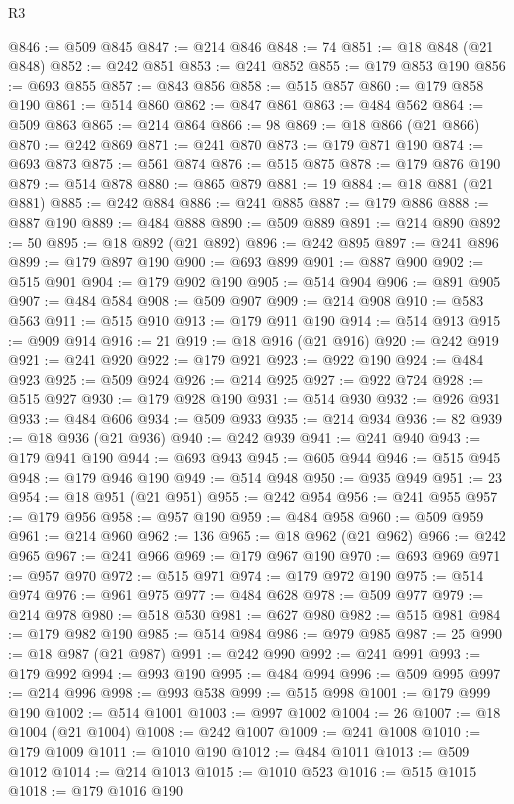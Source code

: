 \begin{lexlean}{R3}
\begin{coremodule}
@846 := @509 @845
@847 := @214 @846
@848 := 74
@851 := @18 @848 (@21 @848)
@852 := @242 @851
@853 := @241 @852
@855 := @179 @853 @190
@856 := @693 @855
@857 := @843 @856
@858 := @515 @857
@860 := @179 @858 @190
@861 := @514 @860
@862 := @847 @861
@863 := @484 @562
@864 := @509 @863
@865 := @214 @864
@866 := 98
@869 := @18 @866 (@21 @866)
@870 := @242 @869
@871 := @241 @870
@873 := @179 @871 @190
@874 := @693 @873
@875 := @561 @874
@876 := @515 @875
@878 := @179 @876 @190
@879 := @514 @878
@880 := @865 @879
@881 := 19
@884 := @18 @881 (@21 @881)
@885 := @242 @884
@886 := @241 @885
@887 := @179 @886
@888 := @887 @190
@889 := @484 @888
@890 := @509 @889
@891 := @214 @890
@892 := 50
@895 := @18 @892 (@21 @892)
@896 := @242 @895
@897 := @241 @896
@899 := @179 @897 @190
@900 := @693 @899
@901 := @887 @900
@902 := @515 @901
@904 := @179 @902 @190
@905 := @514 @904
@906 := @891 @905
@907 := @484 @584
@908 := @509 @907
@909 := @214 @908
@910 := @583 @563
@911 := @515 @910
@913 := @179 @911 @190
@914 := @514 @913
@915 := @909 @914
@916 := 21
@919 := @18 @916 (@21 @916)
@920 := @242 @919
@921 := @241 @920
@922 := @179 @921
@923 := @922 @190
@924 := @484 @923
@925 := @509 @924
@926 := @214 @925
@927 := @922 @724
@928 := @515 @927
@930 := @179 @928 @190
@931 := @514 @930
@932 := @926 @931
@933 := @484 @606
@934 := @509 @933
@935 := @214 @934
@936 := 82
@939 := @18 @936 (@21 @936)
@940 := @242 @939
@941 := @241 @940
@943 := @179 @941 @190
@944 := @693 @943
@945 := @605 @944
@946 := @515 @945
@948 := @179 @946 @190
@949 := @514 @948
@950 := @935 @949
@951 := 23
@954 := @18 @951 (@21 @951)
@955 := @242 @954
@956 := @241 @955
@957 := @179 @956
@958 := @957 @190
@959 := @484 @958
@960 := @509 @959
@961 := @214 @960
@962 := 136
@965 := @18 @962 (@21 @962)
@966 := @242 @965
@967 := @241 @966
@969 := @179 @967 @190
@970 := @693 @969
@971 := @957 @970
@972 := @515 @971
@974 := @179 @972 @190
@975 := @514 @974
@976 := @961 @975
@977 := @484 @628
@978 := @509 @977
@979 := @214 @978
@980 := @518 @530
@981 := @627 @980
@982 := @515 @981
@984 := @179 @982 @190
@985 := @514 @984
@986 := @979 @985
@987 := 25
@990 := @18 @987 (@21 @987)
@991 := @242 @990
@992 := @241 @991
@993 := @179 @992
@994 := @993 @190
@995 := @484 @994
@996 := @509 @995
@997 := @214 @996
@998 := @993 @538
@999 := @515 @998
@1001 := @179 @999 @190
@1002 := @514 @1001
@1003 := @997 @1002
@1004 := 26
@1007 := @18 @1004 (@21 @1004)
@1008 := @242 @1007
@1009 := @241 @1008
@1010 := @179 @1009
@1011 := @1010 @190
@1012 := @484 @1011
@1013 := @509 @1012
@1014 := @214 @1013
@1015 := @1010 @523
@1016 := @515 @1015
@1018 := @179 @1016 @190

\end{coremodule}
\end{lexlean}
